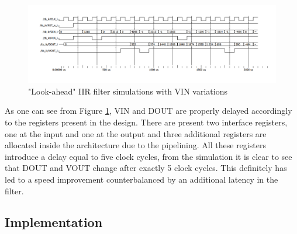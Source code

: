 \documentclass[a4paper, titlepage]{article}
\begin{document}
 \begin{figure} [h]
\centering
	\includegraphics[scale=0.55]{la_start.png}
	\caption{"Look-ahead" IIR filter simulations with VIN variations}
	\label{fig:la_vin}
\end{figure}
\noindent
As one can see from Figure \ref{fig:la_vin}, VIN and DOUT are properly delayed accordingly to the registers present in the design. There are present two interface registers, one at the input and one at the output and three additional registers are allocated inside the architecture due to the pipelining. All these registers introduce a delay equal to five clock cycles, from the simulation it is clear to see that DOUT and VOUT change after exactly 5 clock cycles. This definitely has led to a speed improvement counterbalanced by an additional latency in the filter.
\newpage
\subsection{Implementation}
\end{document}
